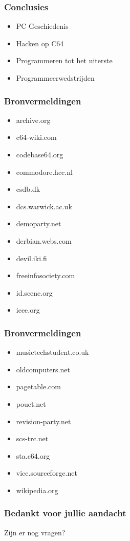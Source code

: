 \documentclass[aspectratio=43]{uva-inf-presentation}
\begin{document}

\begin{frame}
\frametitle{Conclusies}

\begin{itemize}
\item PC Geschiedenis
\item Hacken op C64
\item Programmeren tot het uiterste
\item Programmeerwedstrijden
\end{itemize}

\end{frame}


\begin{frame}
\frametitle{Bronvermeldingen}

\begin{multicols}{2}
\begin{itemize}
\item archive.org
\item c64-wiki.com
\item codebase64.org
\item commodore.hcc.nl
\item csdb.dk
\item dcs.warwick.ac.uk
\item demoparty.net
\item derbian.webs.com
\item devil.iki.fi
\item freeinfosociety.com
\item id.scene.org
\item ieee.org
\end{itemize}
\end{multicols}

\end{frame}


\begin{frame}
\frametitle{Bronvermeldingen}

\begin{multicols}{2}
\begin{itemize}
\item musictechstudent.co.uk
\item oldcomputers.net
\item pagetable.com
\item pouet.net
\item revision-party.net
\item scs-trc.net
\item sta.c64.org
\item vice.sourceforge.net
\item wikipedia.org
\end{itemize}
\end{multicols}

\end{frame}





\begin{frame}
\frametitle{Bedankt voor jullie aandacht}
\Large{\centerline{Zijn er nog vragen?}}
\end{frame}
\end{document}
